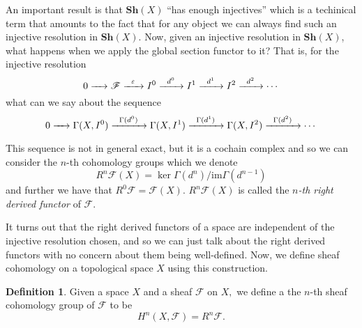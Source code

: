 \documentclass[psamsfonts]{amsart}
\theoremstyle{definition}
\newtheorem{defn}[thm]{Definition}
\theoremstyle{remark}
\numberwithin{equation}{section}
\begin{document}
  An important result is that $\textbf{Sh}(X)$ ``has enough injectives'' which is a techinical term that amounts to the fact that for any object we can always find such an injective resolution in $\textbf{Sh}(X).$ Now, given an injective resolution in $\textbf{Sh}(X)$, what happens when we apply the global section functor to it? That is, for the injective resolution 
  \[0 \xrightarrow{\hspace{.2cm} \hspace{.2cm}} \mathscr{F} \xrightarrow{\hspace{.2cm} \varepsilon \hspace{.2cm}}I^0 \xrightarrow{\hspace{.2cm} d^0 \hspace{.2cm}} I^1 \xrightarrow{\hspace{.2cm} d^1 \hspace{.2cm}} I^2 \xrightarrow{\hspace{.2cm} d^2 \hspace{.2cm}} \cdots \] 
  what can we say about the sequence 
  \[0  \xrightarrow{\hspace{.2cm} \hspace{.2cm}} \Gamma(X,I^0) \xrightarrow{\hspace{.2cm} \Gamma(d^0) \hspace{.2cm}} \Gamma(X,I^1) \xrightarrow{\hspace{.2cm} \Gamma(d^1) \hspace{.2cm}} \Gamma(X,I^2) \xrightarrow{\hspace{.2cm} \Gamma(d^2) \hspace{.2cm}} \cdots\] 

  This sequence is not in general exact, but it is a cochain complex and so we can consider the $n$-th cohomology groups which we denote 
  \[R^n \mathscr{F}(X) = \ker \Gamma(d^n) / \text{im} \Gamma(d^{n-1})\]
  and further we have that $R^0 \mathscr{F} = \mathscr{F}(X).$ $R^n\mathscr{F}(X)$ is called the \textit{$n$-th right derived functor} of $\mathscr{F}.$
  
  It turns out that the right derived functors of a space are independent of the injective resolution chosen, and so we can just talk about the right derived functors with no concern about them being well-defined. \cite{cuboulder} Now, we define sheaf cohomology on a topological space $X$ using this construction.

  \begin{defn}
    Given a space $X$ and a sheaf $\mathscr{F}$ on $X,$ we define a the $n$-th sheaf cohomology group of $\mathscr{F}$ to be 
    \[H^n(X,\mathscr{F}) = R^n\mathscr{F}.\]
  \end{defn}
\end{document}

